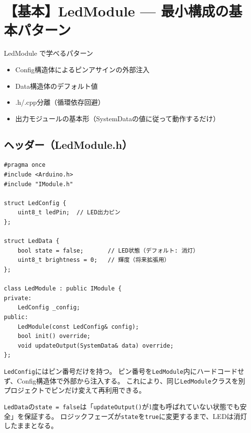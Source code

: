 \section{【基本】LedModule — 最小構成の基本パターン}

\begin{patternbox}{LedModule で学べるパターン}
\begin{itemize}
    \item Config構造体によるピンアサインの外部注入
    \item Data構造体のデフォルト値
    \item .h/.cpp分離（循環依存回避）
    \item 出力モジュールの基本形（SystemDataの値に従って動作するだけ）
\end{itemize}
\end{patternbox}

\subsection{ヘッダー（LedModule.h）}

\begin{lstlisting}[style=cppstyle, caption={LedModule.h}]
#pragma once
#include <Arduino.h>
#include "IModule.h"

struct LedConfig {
    uint8_t ledPin;  // LED出力ピン
};

struct LedData {
    bool state = false;       // LED状態（デフォルト: 消灯）
    uint8_t brightness = 0;   // 輝度（将来拡張用）
};

class LedModule : public IModule {
private:
    LedConfig _config;
public:
    LedModule(const LedConfig& config);
    bool init() override;
    void updateOutput(SystemData& data) override;
};
\end{lstlisting}

\begin{pointbox}[Config構造体のポイント]
\texttt{LedConfig}にはピン番号だけを持つ。
ピン番号を\texttt{LedModule}内にハードコードせず、Config構造体で外部から注入する。
これにより、同じ\texttt{LedModule}クラスを別プロジェクトでピンだけ変えて再利用できる。
\end{pointbox}

\begin{pointbox}[Data構造体のデフォルト値]
\texttt{LedData}の\texttt{state = false}は「\texttt{updateOutput()}が1度も呼ばれていない状態でも安全」を保証する。
ロジックフェーズが\texttt{state}を\texttt{true}に変更するまで、LEDは消灯したままとなる。
\end{pointbox}

